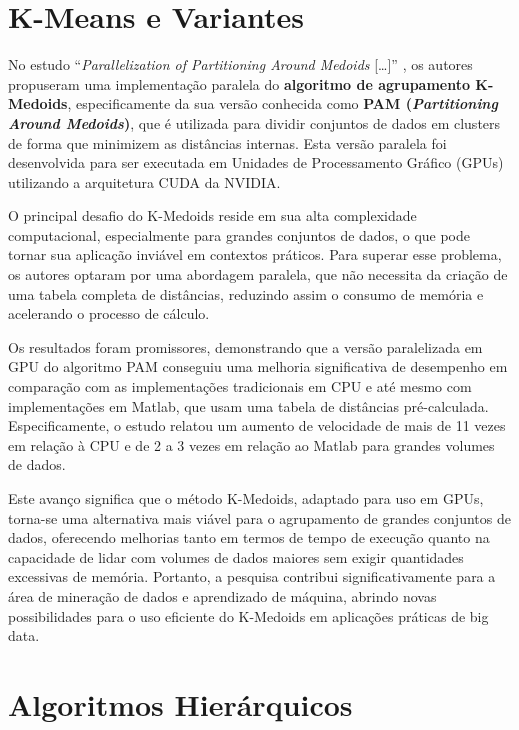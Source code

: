 \documentclass[12pt, %
openright, 
oneside, %
a4paper,    %
brazil]{facom-ufu-abntex2}
\begin{document}

\section{K-Means e Variantes}

No estudo \enquote{\textit{Parallelization of Partitioning Around Medoids} [\dots]} \cite{pamKMedoids2020}, os autores propuseram uma implementação paralela do \textbf{algoritmo de agrupamento K-Medoids}, especificamente da sua versão conhecida como \textbf{PAM (\textit{Partitioning Around Medoids})}, que é utilizada para dividir conjuntos de dados em clusters de forma que minimizem as distâncias internas. Esta versão paralela foi desenvolvida para ser executada em Unidades de Processamento Gráfico (GPUs) utilizando a arquitetura CUDA da NVIDIA.

O principal desafio do K-Medoids reside em sua alta complexidade computacional, especialmente para grandes conjuntos de dados, o que pode tornar sua aplicação inviável em contextos práticos. Para superar esse problema, os autores optaram por uma abordagem paralela, que não necessita da criação de uma tabela completa de distâncias, reduzindo assim o consumo de memória e acelerando o processo de cálculo.

Os resultados foram promissores, demonstrando que a versão paralelizada em GPU do algoritmo PAM conseguiu uma melhoria significativa de desempenho em comparação com as implementações tradicionais em CPU e até mesmo com implementações em Matlab, que usam uma tabela de distâncias pré-calculada. Especificamente, o estudo relatou um aumento de velocidade de mais de 11 vezes em relação à CPU e de 2 a 3 vezes em relação ao Matlab para grandes volumes de dados.

Este avanço significa que o método K-Medoids, adaptado para uso em GPUs, torna-se uma alternativa mais viável para o agrupamento de grandes conjuntos de dados, oferecendo melhorias tanto em termos de tempo de execução quanto na capacidade de lidar com volumes de dados maiores sem exigir quantidades excessivas de memória. Portanto, a pesquisa contribui significativamente para a área de mineração de dados e aprendizado de máquina, abrindo novas possibilidades para o uso eficiente do K-Medoids em aplicações práticas de big data.




\section{Algoritmos Hierárquicos}
\end{document}
